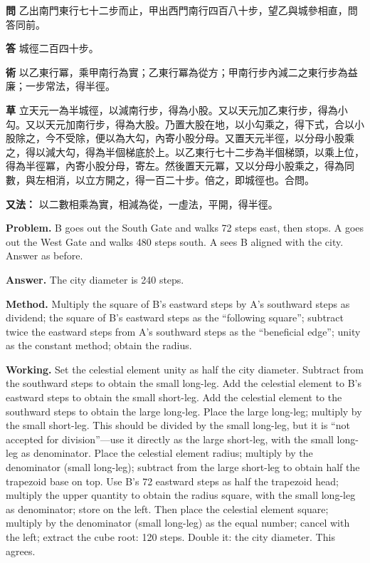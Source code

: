 \documentclass[11pt,a4paper]{article}
\newlength{\chwidth}
\newlength{\enwidth}
\newcommand{\zh}[1]{{\CJKfamily{sf}#1}}
\newenvironment{bilingual}{%
  \noindent
  \begin{minipage}[t]{\chwidth}%
  \small
}{%
  \end{minipage}%
}
\newcommand{\switchcolumn}{%
  \end{minipage}%
  \hfill%
  \begin{minipage}[t]{\enwidth}%
  \small
}
\begin{document}
\begin{bilingual}
\noindent\textbf{\zh{問}} \zh{乙出南門東行七十二步而止，甲出西門南行四百八十步，望乙與城參相直，問答同前。}

\vspace{0.2cm}
\noindent\textbf{\zh{答}} \zh{城徑二百四十步。}

\vspace{0.2cm}
\noindent\textbf{\zh{術}} \zh{以乙東行冪，乘甲南行為實；乙東行冪為從方；甲南行步內減二之東行步為益廉；一步常法，得半徑。}

\vspace{0.2cm}
\noindent\textbf{\zh{草}} \zh{立天元一為半城徑，以減南行步，得為小股。又以天元加乙東行步，得為小勾。又以天元加南行步，得為大股。乃置大股在地，以小勾乘之，得下式，合以小股除之，今不受除，便以為大勾，內寄小股分母。又置天元半徑，以分母小股乘之，得以減大勾，得為半個梯底於上。以乙東行七十二步為半個梯頭，以乘上位，得為半徑冪，內寄小股分母，寄左。然後置天元冪，又以分母小股乘之，得為同數，與左相消，以立方開之，得一百二十步。倍之，即城徑也。合問。}

\vspace{0.2cm}
\noindent\textbf{\zh{又法：}} \zh{以二數相乘為實，相減為從，一虛法，平開，得半徑。}

\switchcolumn

\noindent\textbf{Problem.} B goes out the South Gate and walks 72 steps east, then stops. A goes out the West Gate and walks 480 steps south. A sees B aligned with the city. Answer as before.

\vspace{0.2cm}
\noindent\textbf{Answer.} The city diameter is 240 steps.

\vspace{0.2cm}
\noindent\textbf{Method.} Multiply the square of B's eastward steps by A's southward steps as dividend; the square of B's eastward steps as the ``following square''; subtract twice the eastward steps from A's southward steps as the ``beneficial edge''; unity as the constant method; obtain the radius.

\vspace{0.2cm}
\noindent\textbf{Working.} Set the celestial element unity as half the city diameter. Subtract from the southward steps to obtain the small long-leg. Add the celestial element to B's eastward steps to obtain the small short-leg. Add the celestial element to the southward steps to obtain the large long-leg. Place the large long-leg; multiply by the small short-leg. This should be divided by the small long-leg, but it is ``not accepted for division''---use it directly as the large short-leg, with the small long-leg as denominator. Place the celestial element radius; multiply by the denominator (small long-leg); subtract from the large short-leg to obtain half the trapezoid base on top. Use B's 72 eastward steps as half the trapezoid head; multiply the upper quantity to obtain the radius square, with the small long-leg as denominator; store on the left. Then place the celestial element square; multiply by the denominator (small long-leg) as the equal number; cancel with the left; extract the cube root: 120 steps. Double it: the city diameter. This agrees.


\end{bilingual}
\end{document}

